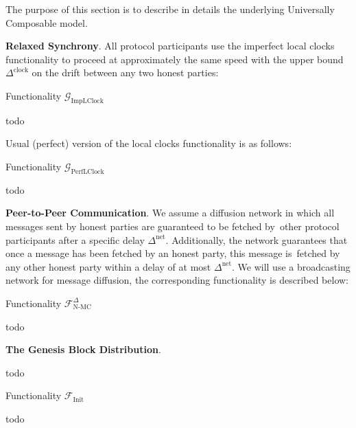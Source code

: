 The purpose of this section is to describe in details the underlying Universally Composable model.

\textbf{Relaxed Synchrony}.\label{apndx:imp-clock}
All protocol participants use the imperfect local clocks functionality to proceed at
approximately the same speed with the upper bound $\Delta^{\text{clock}}$ on the drift between any
two honest parties:
\begin{functionality}
    \caption{Functionality $\mathcal{G}_{\text{ImpLClock}}$}
    \begin{algorithmic}[1]

        todo
    \end{algorithmic}\label{alg:imp-clock}
\end{functionality}

\bigbreak
\bigbreak
\noindent
{}
Usual (perfect) version of the local clocks functionality is as follows:\label{apndx:perf-clock}
\begin{functionality}
    \caption{Functionality $\mathcal{G}_{\text{PerfLClock}}$}
    \begin{algorithmic}[1]

        todo
    \end{algorithmic}\label{alg:perf-clock}
\end{functionality}


\bigbreak
\bigbreak
\noindent
{}
\textbf{Peer-to-Peer Communication}.\label{apndx:net}
We assume a diffusion network in which all messages sent by honest parties are guaranteed to be fetched by\
other protocol participants after a specific delay $\Delta^{\text{net}}$.
Additionally, the network guarantees that once a message has been fetched by an honest party, this message is\
fetched by any other honest party within a delay of at most $\Delta^{\text{net}}$.
We will use a broadcasting network for message diffusion, the corresponding functionality is described below:
\begin{functionality}
    \caption{Functionality $\mathcal{F}^{\Delta}_{\text{N-MC}}$}
    \begin{algorithmic}[1]

        todo
    \end{algorithmic}\label{alg:net}
\end{functionality}

\bigbreak
\bigbreak
\noindent
{}
\textbf{The Genesis Block Distribution}.\label{apndx:init}

todo
\begin{functionality}
    \caption{Functionality $\mathcal{F}_{\text{Init}}$}
    \begin{algorithmic}[1]

        todo
    \end{algorithmic}\label{alg:init}
\end{functionality}


